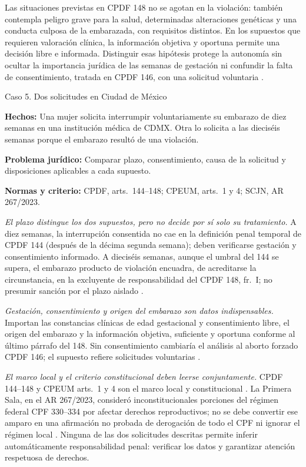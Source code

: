 \documentclass[spanish,letterpaper,oneside]{article}
\newcommand{\fichacaso}[3]{%
	\begin{tcolorbox}[colback=casoverde!5,colframe=casoverde!30,
		boxrule=0.4pt,arc=0.6mm,left=2mm,right=2mm,top=1mm,bottom=1mm]
	\textbf{Hechos:} #1\par
	\textbf{Problema jurídico:} #2\par
	\textbf{Normas y criterio:} #3
	\end{tcolorbox}%
}
\begin{document}
Las situaciones previstas en CPDF 148 no se agotan en la violación: también contempla peligro grave para la salud, determinadas alteraciones genéticas y una conducta culposa de la embarazada, con requisitos distintos. En los supuestos que requieren valoración clínica, la información objetiva y oportuna permite una decisión libre e informada. Distinguir esas hipótesis protege la autonomía sin ocultar la importancia jurídica de las semanas de gestación ni confundir la falta de consentimiento, tratada en CPDF 146, con una solicitud voluntaria \citep[arts.~146--148]{cpdfS3Consolidado}.

\begin{casoestudio}{Caso 5. Dos solicitudes en Ciudad de México}
\fichacaso{Una mujer solicita interrumpir voluntariamente su embarazo de diez semanas en una institución médica de CDMX. Otra lo solicita a las dieciséis semanas porque el embarazo resultó de una violación.}{Comparar plazo, consentimiento, causa de la solicitud y disposiciones aplicables a cada supuesto.}{CPDF, arts.~144--148; CPEUM, arts.~1 y 4; SCJN, AR 267/2023.}
\textit{El plazo distingue los dos supuestos, pero no decide por sí solo su tratamiento.} A diez semanas, la interrupción consentida no cae en la definición penal temporal de CPDF 144 (después de la décima segunda semana); deben verificarse gestación y consentimiento informado. A dieciséis semanas, aunque el umbral del 144 se supera, el embarazo producto de violación encuadra, de acreditarse la circunstancia, en la excluyente de responsabilidad del CPDF 148, fr.~I; no presumir sanción por el plazo aislado \citep{cpdfS3Consolidado}.

\textit{Gestación, consentimiento y origen del embarazo son datos indispensables.} Importan las constancias clínicas de edad gestacional y consentimiento libre, el origen del embarazo y la información objetiva, suficiente y oportuna conforme al último párrafo del 148. Sin consentimiento cambiaría el análisis al aborto forzado CPDF 146; el supuesto refiere solicitudes voluntarias \citep{cpdfS3Consolidado}.

\textit{El marco local y el criterio constitucional deben leerse conjuntamente.} CPDF 144--148 y CPEUM arts.~1 y 4 son el marco local y constitucional \citep{cpdfS3Consolidado,cpeumAulaS3}. La Primera Sala, en el AR 267/2023, consideró inconstitucionales porciones del régimen federal CPF 330--334 por afectar derechos reproductivos; no se debe convertir ese amparo en una afirmación no probada de derogación de todo el CPF ni ignorar el régimen local \citep{scjnAR2672023}. Ninguna de las dos solicitudes descritas permite inferir automáticamente responsabilidad penal: verificar los datos y garantizar atención respetuosa de derechos.
\end{casoestudio}
\end{document}
